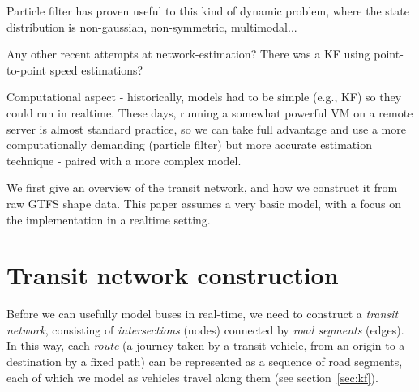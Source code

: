\documentclass[times, doublespace]{anzsauth}
\begin{document}




Particle filter has proven useful to this kind of dynamic problem,
where the state distribution is non-gaussian, non-symmetric, 
multimodal...

Any other recent attempts at network-estimation?
There was a KF using point-to-point speed estimations? 

Computational aspect - historically, models had to be simple 
(e.g., KF) so they could run in realtime.
These days, running a somewhat powerful VM on a remote server
is almost standard practice, so we can take full advantage 
and use a more computationally demanding (particle filter)
but more accurate estimation technique - paired with a more complex model.

We first give an overview of the transit network,
and how we construct it from raw GTFS shape data.
This paper assumes a very basic model,
with a focus on the implementation in a realtime setting.




\section{Transit network construction}
\label{sec:gtfs}

Before we can usefully model buses in real-tim{}e, 
we need to construct a \emph{transit network},
consisting of \emph{intersections} (nodes)
connected by \emph{road segments} (edges).
In this way, each \emph{route} 
(a journey taken by a transit vehicle, from an origin to a destination by a fixed path)
can be represented as a sequence of road segments,
each of which we model as vehicles travel along them (see section~\ref{sec:kf}).
\end{document}
